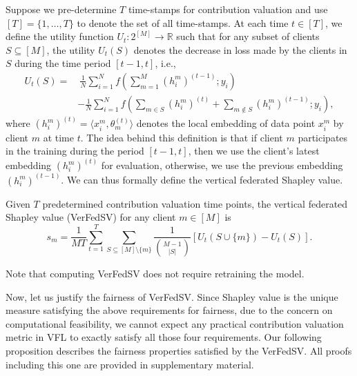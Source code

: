 Suppose we pre-determine $T$ time-stamps for contribution valuation and use $[T] = \{1,\dots, T\}$ to denote the set of all time-stamps. At each time $t \in [T]$, we define the utility function $U_t:2^{[M]}\to\mathbb{R}$ such that for any subset of clients $S \subseteq [M]$, the utility $U_t(S)$ denotes the decrease in loss made by the clients in $S$ during the time period $[t-1, t]$, i.e., 
\begin{align} \label{eq:utility2}
    U_t(S) = &~ \frac{1}{N} \sum_{i=1}^N f\left( \sum_{m=1}^M (h_i^m)^{(t-1)}; y_i\right) \nonumber
    \\& - \frac{1}{N} \sum_{i=1}^N f\left( \sum_{m\in S} (h_i^m)^{(t)} + \sum_{m\notin S} (h_i^m)^{(t-1)}; y_i\right),
\end{align}
where $(h_i^m)^{(t)} = \langle x_i^m, \theta_m^{(t)} \rangle$ denotes the local embedding of data point $x_i^m$ by client $m$ at time $t$. The idea behind this definition is that if client $m$ participates in the training during the period $[t-1, t]$, then we use the client's latest embedding $(h_i^m)^{(t)}$ for evaluation, otherwise, we use the previous embedding $(h_i^m)^{(t-1)}$. We can thus formally define the vertical federated Shapley value.
\begin{definition} \label{def:vertical_fedsv}
    Given $T$ predetermined contribution valuation time points, the vertical federated Shapley value (VerFedSV) for any client $m \in [M]$ is
    \[s_m = \frac{1}{MT}\sum_{t=1}^T\sum_{S \subseteq [M] \setminus \{m\}} \frac{1}{\binom{M-1}{|S|}} [U_t(S\cup\{m\}) - U_t(S)].\]
\end{definition}
Note that computing VerFedSV does not require retraining the model. 

Now, let us justify the fairness of VerFedSV. Since Shapley value is the unique measure satisfying the above requirements for fairness, due to the concern on computational feasibility, we cannot expect any practical contribution valuation metric in VFL to exactly satisfy all those four requirements. Our following proposition describes the fairness properties satisfied by the VerFedSV. All proofs including this one are provided in supplementary material.

